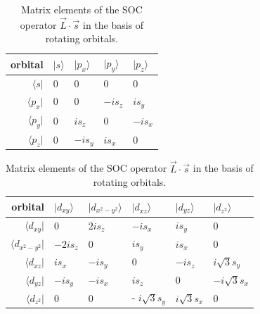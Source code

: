 \begin{table}[h!]
\begin{tabularx}{\textwidth}{|r| X X X X|}
\hline
orbital & $|s \rangle$ & $|p_x \rangle$ & $|p_y \rangle$ & $|p_z \rangle$ \\ \hline
$\langle s|$ & 0 & 0 & 0 & 0 \\
$\langle p_x|$ & 0 & 0 & $- i s_z$ & $i s_y$ \\
$\langle p_y|$ & 0 & $i s_{z} $ & 0 & $- i s_{x} $ \\
$\langle p_z|$ & 0 & $-i s_y$ & $i s_{x} $ & 0 \\
\hline
\end{tabularx}
\newline
\vspace*{0.5 cm}
\newline
\begin{tabularx}{\textwidth}{|r| X X X X X|}
\hline
orbital & $|d_{xy} \rangle$ & $|d_{x^2-y^2}	\rangle$ & $|d_{xz} \rangle$ & $|d_{yz} \rangle$ & $|d_{z^2} \rangle $ \\ \hline
$\langle d_{xy}|$ & 0 & $2 i s_z $ & $-i s_x $ & $i s_y$ & 0\\
$\langle d_{x^2 - y^2}|$ & $-2 i s_z$ & $0$ & $i s_{y} $ & $i s_x $ & 0\\
$\langle d_{xz}|$ & $i s_x$ & $- i s_{y} $ & 0 & $-i s_{z} $ & $i \sqrt{3} s_y$\\
$\langle d_{yz}|$ & $- i s_y $ & $ - i s_x$ & $i s_{z} $ & $0$ & $-i \sqrt{3} s_x $\\
$\langle d_{z^2}|$ & 0 & 0 & - $i \sqrt{3} s_y$ & $i \sqrt{3} s_{x} $ & $0$\\
\hline
\end{tabularx}
\caption{Matrix elements of the SOC operator $\vec{L} \cdot \vec{s}$ in the basis of rotating orbitals.}
\label{tab:soc2}
\end{table}
